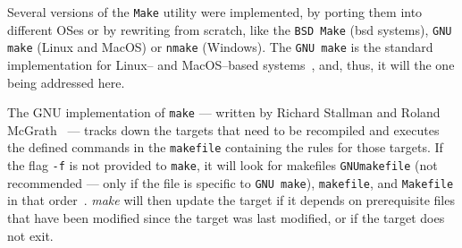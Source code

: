 Several versions of the \texttt{Make} utility were implemented, by porting them
into different OSes or by rewriting from scratch, like the \texttt{BSD Make}
(\gls{bsd} systems),
\texttt{GNU make} (Linux and MacOS) or \texttt{nmake} (Windows). The \texttt{GNU
make} is the standard implementation for Linux-- and MacOS--based systems~\cite{robbins2005unix}, and,
thus, it will the one being addressed here.

The GNU implementation of \texttt{make} --- written by Richard Stallman and
Roland McGrath ~\cite{stallman2002gnu}--- tracks down the targets that need to
be recompiled and executes the defined commands in the \texttt{makefile}
containing the rules for those targets. If the flag \texttt{-f} is not provided
to \texttt{make}, it will look for makefiles \texttt{GNUmakefile} (not
recommended --- only if the file is specific to \texttt{GNU make}),
\texttt{makefile}, and \texttt{Makefile} in that
order~\cite{stallman2002gnu}. \emph{make} will then update the target if it
depends on prerequisite files that have been modified since the target was last
modified, or if the target does not exit.


